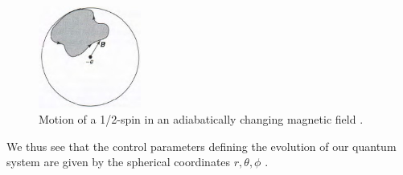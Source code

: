 \documentclass{article}
\begin{document}
\begin{figure}
  \label{fig:spin_system}
  \includegraphics[width=0.3\textwidth]{b_spin_system_2}
  \caption{Motion of a 1/2-spin in an adiabatically changing magnetic field \cite{Griffiths2017}.}
\end{figure}

We thus see that the control parameters defining the evolution of our quantum system are given by the spherical coordinates $r, \theta, \phi$ \cite{Griffiths2017}.\\
\end{document}

